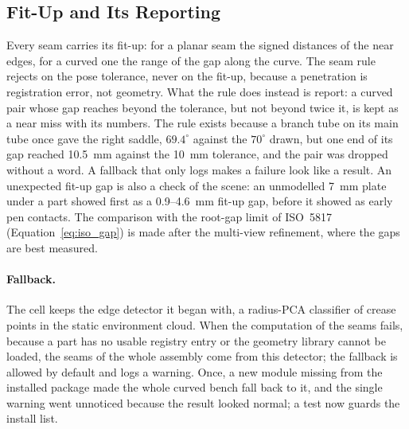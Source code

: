 \subsection{Fit-Up and Its Reporting}
\label{sec:mc_fitup}
Every seam carries its fit-up: for a planar seam the signed distances of the near edges, for a curved
one the range of the gap along the curve. The seam rule rejects on the pose tolerance, never on the
fit-up, because a penetration is registration error, not geometry. What the rule does instead is report:
a curved pair whose gap reaches beyond the tolerance, but not beyond twice it, is kept as a near miss
with its numbers. The rule exists because a branch tube on its main tube once gave the right saddle,
$69.4^\circ$ against the $70^\circ$ drawn, but one end of its gap reached 10.5~mm against the 10~mm
tolerance, and the pair was dropped without a word. A fallback that only logs makes a failure look like
a result. An unexpected fit-up gap is also a check of the scene: an unmodelled 7~mm plate under a part
showed first as a 0.9--4.6~mm fit-up gap, before it showed as early pen contacts. The comparison with
the root-gap limit of ISO~5817 (Equation~\ref{eq:iso_gap}) is made after the multi-view refinement,
where the gaps are best measured.

\paragraph{Fallback.} The cell keeps the edge detector it began with, a radius-PCA classifier of crease
points in the static environment cloud. When the computation of the seams fails, because a part has no
usable registry entry or the geometry library cannot be loaded, the seams of the whole assembly come
from this detector; the fallback is allowed by default and logs a warning. Once, a new module missing
from the installed package made the whole curved bench fall back to it, and the single warning went
unnoticed because the result looked normal; a test now guards the install list.

